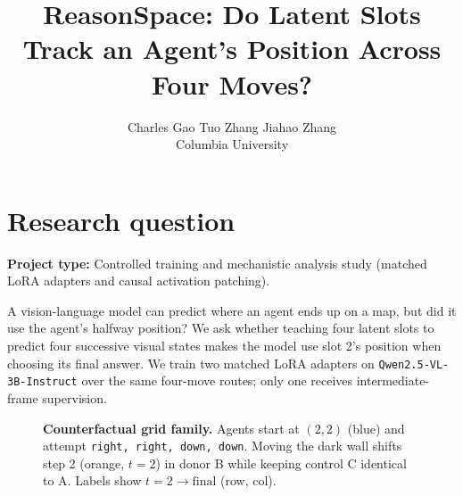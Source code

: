 \documentclass{article}
\title{ReasonSpace: Do Latent Slots Track an Agent's Position Across Four Moves?}
\author{Charles Gao \qquad Tuo Zhang \qquad Jiahao Zhang\\Columbia University}
\begin{document}
\maketitle

\section{Research question}
\textbf{Project type:} Controlled training and mechanistic analysis study (matched LoRA adapters and causal activation patching).

A vision-language model can predict where an agent ends up on a map, but did it use the agent's halfway position? We ask whether teaching four latent slots to predict four successive visual states makes the model use slot 2's position when choosing its final answer. We train two matched LoRA adapters on \texttt{Qwen2.5-VL-3B-Instruct} over the same four-move routes; only one receives intermediate-frame supervision.

\begin{figure}[ht!]
\centering
{}
\caption{\textbf{Counterfactual grid family.} Agents start at $(2,2)$ (blue) and attempt \texttt{right, right, down, down}. Moving the dark wall shifts step 2 (orange, $t{=}2$) in donor B while keeping control C identical to A. Labels show $t{=}2\!\rightarrow\!\text{final}$ (row, col).}
\label{fig:setup}
\end{figure}
\end{document}
